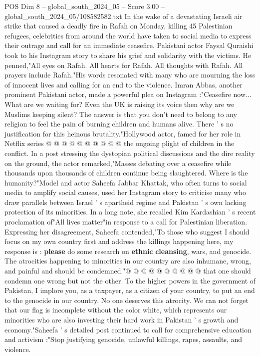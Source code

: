 \begin{textsample}{POS Dim 8 – global\_south\_2024\_05 – Score 3.00 – global\_south\_2024\_05/108582582.txt}  \label{ex:f8_pos_347}
In the wake of a devastating Israeli air strike that caused a deadly fire in Rafah on Monday, killing 45 Palestinian refugees, celebrities from around the world have taken to social media to express their outrage and call for an immediate ceasefire.
Pakistani actor Faysal Quraishi took to his Instagram story to share his grief and solidarity with the victims.
He penned,"All eyes on Rafah.
All hearts for Rafah.
All thoughts with Rafah.
All prayers include Rafah."His words resonated with many who are mourning the loss of innocent lives and calling for an end to the violence.
Imran Abbas, another prominent Pakistani actor, made a powerful plea on Instagram :"Ceasefire now...
What are we waiting for?
Even the UK is raising its voice then why are we Muslims keeping silent?
The answer is that you don't need to belong to any religion to feel the pain of burning children and humans alive.
There ' s no justification for this heinous brutality."Hollywood actor, famed for her role in Netflix series @ @ @ @ @ @ @ @ @ @ the ongoing plight of children in the conflict.
In a post stressing the dystopian political discussions and the dire reality on the ground, the actor remarked,"Masses debating over a ceasefire while thousands upon thousands of children continue being slaughtered.
Where is the humanity?"Model and actor Saheefa Jabbar Khattak, who often turns to social media to amplify social causes, used her Instagram story to criticise many who draw parallels between Israel ' s apartheid regime and Pakistan ' s own lacking protection of its minorities.
In a long note, she recalled Kim Kardashian ' s recent proclamation of"All lives matter"in response to a call for Palestinian liberation.
Expressing her disagreement, Saheefa contended,"To those who suggest I should focus on my own country first and address the killings happening here, my response is : \textbf{please} do some research on \textbf{ethnic} \textbf{cleansing}, wars, and genocide.
The atrocities happening to minorities in our country are also inhumane, wrong, and painful and should be condemned."@ @ @ @ @ @ @ @ @ @ that one should condemn one wrong but not the other.
To the higher powers in the government of Pakistan, I implore you, as a taxpayer, as a citizen of your country, to put an end to the genocide in our country.
No one deserves this atrocity.
We can not forget that our flag is incomplete without the color white, which represents our minorities who are also investing their hard work in Pakistan ' s growth and economy."Saheefa ' s detailed post continued to call for comprehensive education and activism :"Stop justifying genocide, unlawful killings, rapes, assaults, and violence.

\end{textsample}
